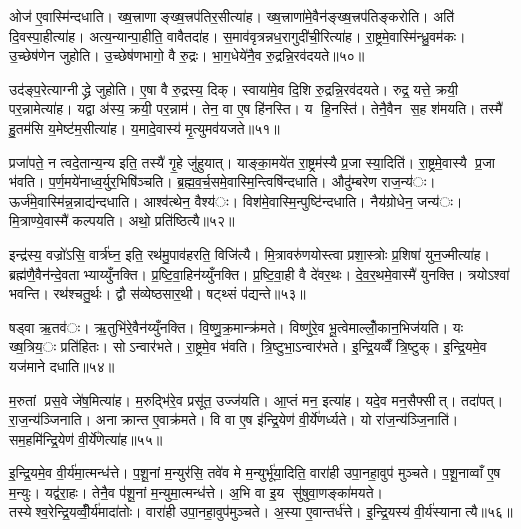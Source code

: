 ओज॑ ए॒वास्मि॑न्दधाति। ख्ष॒त्त्राणाङ्ख्ष॒त्त्रप॑तिर॒सीत्या॑ह। ख्ष॒त्त्राणा॑मे॒वैन॑ङ्ख्ष॒त्त्रप॑तिङ्करोति। अति॑ दि॒वस्पा॒हीत्या॑ह। अत्य॒न्यान्पा॒हीति॒ वावैतदा॑ह। स॒माव॑वृत्रन्नध॒रागुदी॑ची॒रित्या॑ह। रा॒ष्ट्रमे॒वास्मि॑न्ध्रु॒वम॑कः। उ॒च्छेष॑णेन जुहोति। उ॒च्छेष॑णभागो॒ वै रु॒द्रः। भा॒ग॒धेये॑नै॒व रु॒द्रन्नि॒रव॑दयते॥५०॥

उद॑ङ्प॒रेत्याग्नीद्ध्रे जुहोति। ए॒षा वै रु॒द्रस्य॒ दिक्। स्वाया॑मे॒व दि॒शि रु॒द्रन्नि॒रव॑दयते। रुद्र॒ यत्ते॒ क्रयी॒ पर॒न्नामेत्या॑ह। यद्वा अ॑स्य॒ क्रयी॒ पर॒न्नाम॑। तेन॒ वा ए॒ष हि॑नस्ति। य हि॒नस्ति॑। तेनै॒वैन स॒ह श॑मयति। तस्मै॑ हु॒तम॑सि य॒मेष्ट॑म॒सीत्या॑ह। य॒मादे॒वास्य॑ मृ॒त्युमव॑यजते॥५१॥

प्रजा॑पते॒ न त्वदे॒तान्य॒न्य इति॒ तस्यै॑ गृ॒हे जु॑हुयात्। याङ्का॒मये॑त रा॒ष्ट्रम॑स्यै प्र॒जा स्या॒दिति॑। रा॒ष्ट्रमे॒वास्यै प्र॒जा भ॑वति। प॒र्ण॒मये॑नाध्व॒र्युर॒भिषि॑ञ्चति। ब्र॒ह्म॒व॒र्च॒समे॒वास्मि॒न्त्विषि॑न्दधाति। औदु॑म्बरेण राज॒न्य॑ः। ऊर्ज॑मे॒वास्मि॑न्न॒न्नाद्य॑न्दधाति। आश्व॑त्थेन॒ वैश्य॑ः। विश॑मे॒वास्मि॒न्पुष्टि॑न्दधाति। नैय॑ग्रोधेन॒ जन्य॑ः। मि॒त्राण्ये॒वास्मै॑ कल्पयति। अथो॒ प्रति॑ष्ठित्यै॥५२॥


इन्द्र॑स्य॒ वज्रो॑ऽसि॒ वार्त्र॑घ्न॒ इति॒ रथ॑मु॒पाव॑हरति॒ विजि॑त्यै। मि॒त्रावरु॑णयोस्त्वा प्रशा॒स्त्रोः प्र॒शिषा॑ युन॒ज्मीत्या॑ह। ब्रह्म॑णै॒वैन॑न्दे॒वताभ्याय्युँनक्ति। प्र॒ष्टि॒वा॒हिन॑य्युँनक्ति। प्र॒ष्टि॒वा॒ही वै दे॑वर॒थः। दे॒व॒र॒थमे॒वास्मै॑ युनक्ति। त्रयोऽश्वा॑ भवन्ति। रथ॑श्चतु॒र्थः। द्वौ स॑व्येष्ठसार॒थी। षट्थ्सं प॑द्यन्ते॥५३॥

षड्वा ऋ॒तव॑ः। ऋ॒तुभि॑रे॒वैन॑य्युँनक्ति। वि॒ष्णु॒क्र॒मान्क्र॑मते। विष्णु॑रे॒व भू॒त्वेमाल्लोँ॒कान॒भिज॑यति। यः ख्ष॒त्रिय॒ः प्रति॑हितः। सोऽन्वार॑भते। रा॒ष्ट्रमे॒व भ॑वति। त्रि॒ष्टुभा॒ऽन्वार॑भते। इ॒न्द्रि॒यव्वैँ त्रि॒ष्टुक्। इ॒न्द्रि॒यमे॒व यज॑माने दधाति॥५४॥

म॒रुतां प्रस॒वे जे॑ष॒मित्या॑ह। म॒रुद्भि॑रे॒व प्रसू॑त॒ उज्ज॑यति। आ॒प्तं मन॒ इत्या॑ह। यदे॒व मन॒सैफ्सीत्। तदा॑पत्। रा॒ज॒न्य॑ञ्जिनाति। अनाक्रान्त ए॒वाक्र॑मते। वि वा ए॒ष इ॑न्द्रि॒येण॑ वी॒र्ये॑णर्ध्यते। यो रा॑ज॒न्य॑ञ्जि॒नाति॑। सम॒हमि॑न्द्रि॒येण॑ वी॒र्ये॑णेत्या॑ह॥५५॥

इ॒न्द्रि॒यमे॒व वी॒र्य॑मा॒त्मन्ध॑त्ते। प॒शू॒नां म॒न्युर॑सि॒ तवे॑व मे म॒न्युर्भू॑या॒दिति॒ वारा॑ही उपा॒नहा॒वुप॑ मुञ्चते। प॒शू॒नाव्वाँ ए॒ष म॒न्युः। यद्व॑रा॒हः। तेनै॒व प॑शू॒नां म॒न्युमा॒त्मन्ध॑त्ते। अ॒भि वा इ॒य सु॑षुवा॒णङ्का॑मयते। तस्येश्व॒रेन्द्रि॒यव्वीँ॒र्य॑मादा॑तोः। वारा॑ही उपा॒नहा॒वुप॑मुञ्चते। अ॒स्या ए॒वान्तर्ध॑त्ते। इ॒न्द्रि॒यस्य॑ वी॒र्य॑स्यानात्यै॥५६॥

